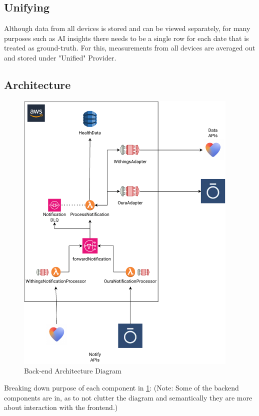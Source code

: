 \subsection{Unifying}
Although data from all devices is stored and can be viewed separately, for many purposes such as AI insights there needs to be a single row for each date that is treated as ground-truth. For this, measurements from all devices are averaged out and stored under "Unified" Provider. 
\subsection{Architecture}
\begin{figure}
    
    \centering
    \includegraphics[width=0.95\textwidth,height=\textheight,keepaspectratio]{../images/backend.pdf}
    \caption{Back-end Architecture Diagram}
    \label{fig:backend}
    
\end{figure}
Breaking down purpose of each component in \ref{fig:backend}: (Note: Some of the backend components are in, as to not clutter the diagram and semantically they are more about interaction with the frontend.)

